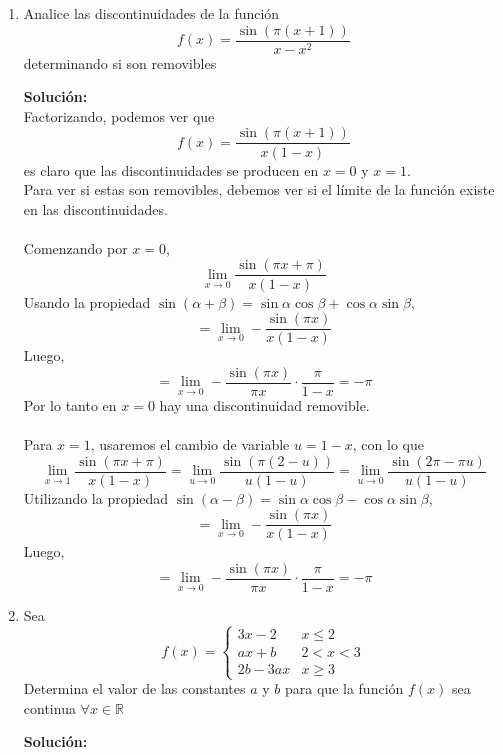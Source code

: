 \documentclass[12pt]{article}
\newenvironment{solucion}
{\begin{mdframed}[backgroundcolor=black!10]
		{\bf Solución:}\\
	}
	{
	\end{mdframed}
}
\newenvironment{preguntas}
{\begin{enumerate}\itemsep12pt
	}
	{
	\end{enumerate}
}
\newcommand{\ra}{\rightarrow}
\newcommand{\R}{\mathbb{R}}
\begin{document}
\begin{preguntas}
\begin{solucion}
\begin{enumerate}[a)]
$$\lim\limits_{x \ra \frac{\pi}{2}} \left(\dfrac{\pi}{2} - x \right) \tan x =
\lim\limits_{u \ra 0} u \tan \left(\dfrac{\pi}{2} - u \right) =
\lim\limits_{u \ra 0} u \tan u =
0$$
\item $\lim\limits_{x \ra \pi} \dfrac{(x - \pi)^2}{\sin ^2 x}$ \\
\\
De manera análoga, usaremos el cambio de variable $u = x - \pi $, con lo que
$$\lim\limits_{x \ra \pi} \dfrac{(x - \pi)^2}{\sin ^2 x} = 
\lim\limits_{u \ra 0} \dfrac{u^2}{(\sin (\pi + u))^2} = 
\lim\limits_{u \ra 0} \dfrac{u^2}{(-\sin u)^2} =  
\lim\limits_{u \ra 0} \dfrac{1}{\left(\dfrac{\sin u}{u}\right)^2} = 1$$
\end{enumerate}
\end{solucion}
\item Analice las discontinuidades de la función
$$ f(x) = \dfrac{\sin(\pi(x+1))}{x-x^2} $$
determinando si son removibles
\begin{solucion}
Factorizando, podemos ver que
$$ f(x) = \dfrac{\sin(\pi(x+1))}{x(1-x)} $$
es claro que las discontinuidades se producen en $x=0$ y $x=1$.\\
Para ver si estas son removibles, debemos ver si el límite de la función existe en las discontinuidades.\\\\
Comenzando por $x=0$,
$$\lim\limits_{x \ra 0} \dfrac{\sin(\pi x+ \pi)}{x(1-x)}$$
Usando la propiedad $\sin (\alpha + \beta) = \sin \alpha \cos \beta + \cos \alpha \sin \beta$,
$$=\lim\limits_{x \ra 0} -\dfrac{\sin(\pi x)}{x(1-x)}$$
Luego,
$$=\lim\limits_{x \ra 0} -\dfrac{\sin(\pi x)}{\pi x} \cdot \dfrac{\pi}{1-x} = 
-\pi$$
Por lo tanto en $x=0$ hay una discontinuidad removible.\\
\\
Para $x=1$, usaremos el cambio de variable $u=1-x$, con lo que
$$\lim\limits_{x \ra 1} \dfrac{\sin(\pi x+ \pi)}{x(1-x)} =
\lim\limits_{u \ra 0} \dfrac{\sin(\pi (2-u))}{u(1-u)} =
\lim\limits_{u \ra 0} \dfrac{\sin(2\pi - \pi u)}{u(1-u)}$$
Utilizando la propiedad $\sin (\alpha - \beta) = \sin \alpha \cos \beta - \cos \alpha \sin \beta$,
$$=\lim\limits_{x \ra 0} -\dfrac{\sin(\pi x)}{x(1-x)}$$
Luego,
$$=\lim\limits_{x \ra 0} -\dfrac{\sin(\pi x)}{\pi x} \cdot \dfrac{\pi}{1-x} = 
-\pi$$
\end{solucion}
\item Sea 
$$f(x) = \begin{cases}
3x - 2 & x \leq 2\\
ax+b & 2 < x < 3 \\
2b-3ax & x \geq 3
\end{cases}$$
Determina el valor de las constantes $a$ y $b$ para que la función $f(x)$ sea continua $\forall x \in \R$
\begin{solucion}


\end{solucion}
\end{preguntas}
\end{document}
